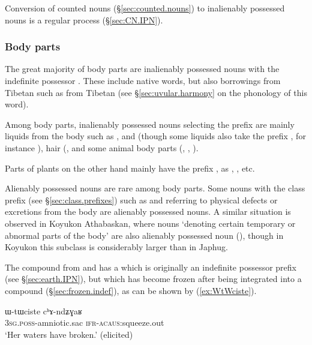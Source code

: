 Conversion of counted nouns (§\ref{sec:counted.nouns}) to inalienably possessed nouns is a regular process (§\ref{sec:CN.IPN}).

\subsubsection{Body parts} \label{sec:body.part}
The great majority of body parts are inalienably possessed nouns with the indefinite possessor . These include native words, but also borrowings from Tibetan such as  from Tibetan  (see §\ref{sec:uvular.harmony} on the phonology of this word).

Among body parts, inalienably possessed nouns selecting the prefix  are mainly liquids from the body such as ,  and  (though some liquids also take the prefix , for instance ), hair (,  and some animal body parts (, , ).

Parts of plants on the other hand mainly have the prefix , as , ,  etc.

Alienably possessed nouns are rare among body parts. Some nouns with the  class prefix (see §\ref{sec:class.prefixes}) such as  and  referring to physical defects or excretions from the body are alienably possessed nouns. A similar situation is observed in Koyukon Athabaskan, where nouns `denoting certain temporary or abnormal parts of the body' are also alienably possessed noun (\citealt[660]{thompson96koyukon}), though in Koyukon this subclass is considerably larger than in Japhug.

The compound  from  and  has a  which is originally an indefinite possessor prefix (see §\ref{sec:earth.IPN}), but which has become frozen after being integrated into a compound (§\ref{sec:frozen.indef}), as can be shown by (\ref{ex:WtWciste}). 

\begin{exe}
\ex \label{ex:WtWciste}
\gll ɯ-tɯciste cʰɤ-ndʑɣaʁ \\
\textsc{3sg}.\textsc{poss}-amniotic.sac \textsc{ifr}-\textsc{acaus}:squeeze.out \\
\glt `Her waters have broken.' (elicited)
\end{exe}


